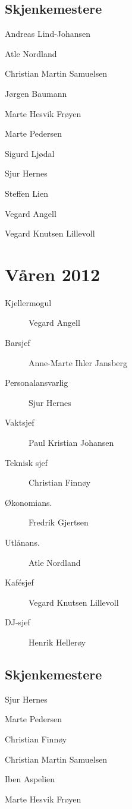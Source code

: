 \subsection*{Skjenkemestere}

\begin{description}
	\item Andreas Lind-Johansen
	\item Atle Nordland
	\item Christian Martin Samuelsen
	\item Jørgen Baumann
	\item Marte Hesvik Frøyen
	\item Marte Pedersen
	\item Sigurd Ljødal
	\item Sjur Hernes
	\item Steffen Lien
	\item Vegard Angell
	\item Vegard Knutsen Lillevoll
\end{description}

\section*{Våren 2012}

\begin{description}
	\item[Kjellermogul] Vegard Angell
	\item[Barsjef] Anne-Marte Ihler Jansberg
	\item[Personalansvarlig] Sjur Hernes
	\item[Vaktsjef] Paul Kristian Johansen
	\item[Teknisk sjef] Christian Finnøy
	\item[Økonomians.] Fredrik Gjertsen
	\item[Utlånans.] Atle Nordland
	\item[Kafésjef] Vegard Knutsen Lillevoll
	\item[DJ-sjef] Henrik Hellerøy
\end{description}

\subsection*{Skjenkemestere}

\begin{description}
	\item Sjur Hernes
	\item Marte Pedersen
	\item Christian Finnøy
	\item Christian Martin Samuelsen
	\item Iben Aspelien
	\item Marte Hesvik Frøyen
\end{description}

